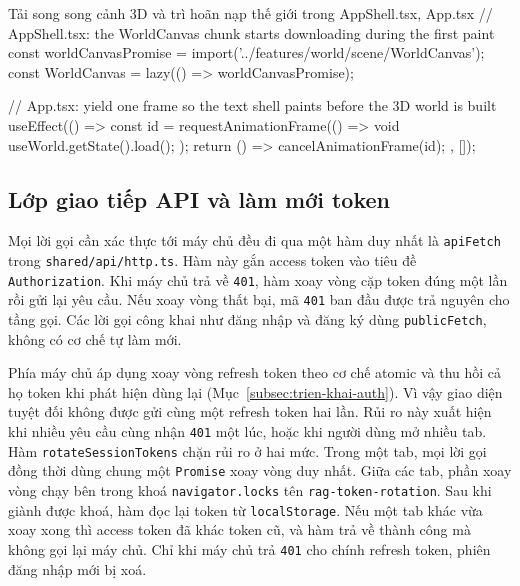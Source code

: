 \begin{tsbox}{Tải song song cảnh 3D và trì hoãn nạp thế giới trong AppShell.tsx, App.tsx}
// AppShell.tsx: the WorldCanvas chunk starts downloading during the first paint
const worldCanvasPromise = import('../features/world/scene/WorldCanvas');
const WorldCanvas = lazy(() => worldCanvasPromise);

// App.tsx: yield one frame so the text shell paints before the 3D world is built
useEffect(() => {
  const id = requestAnimationFrame(() => {
    void useWorld.getState().load();
  });
  return () => cancelAnimationFrame(id);
}, []);
\end{tsbox}

\subsection{Lớp giao tiếp API và làm mới token}
\label{subsec:fe-lop-api}

Mọi lời gọi cần xác thực tới máy chủ đều đi qua một hàm duy nhất là \texttt{apiFetch} trong \texttt{shared/\allowbreak{}api/\allowbreak{}http.ts}. Hàm này gắn access token vào tiêu đề \texttt{Authorization}. Khi máy chủ trả về \texttt{401}, hàm xoay vòng cặp token đúng một lần rồi gửi lại yêu cầu. Nếu xoay vòng thất bại, mã \texttt{401} ban đầu được trả nguyên cho tầng gọi. Các lời gọi công khai như đăng nhập và đăng ký dùng \texttt{publicFetch}, không có cơ chế tự làm mới.


Phía máy chủ áp dụng xoay vòng refresh token theo cơ chế atomic và thu hồi cả họ token khi phát hiện dùng lại (Mục~\ref{subsec:trien-khai-auth}). Vì vậy giao diện tuyệt đối không được gửi cùng một refresh token hai lần. Rủi ro này xuất hiện khi nhiều yêu cầu cùng nhận \texttt{401} một lúc, hoặc khi người dùng mở nhiều tab. Hàm \texttt{rotateSessionTokens} chặn rủi ro ở hai mức. Trong một tab, mọi lời gọi đồng thời dùng chung một \texttt{Promise} xoay vòng duy nhất. Giữa các tab, phần xoay vòng chạy bên trong khoá \texttt{navigator.locks} tên \texttt{rag-token-rotation}. Sau khi giành được khoá, hàm đọc lại token từ \texttt{localStorage}. Nếu một tab khác vừa xoay xong thì access token đã khác token cũ, và hàm trả về thành công mà không gọi lại máy chủ. Chỉ khi máy chủ trả \texttt{401} cho chính refresh token, phiên đăng nhập mới bị xoá.

